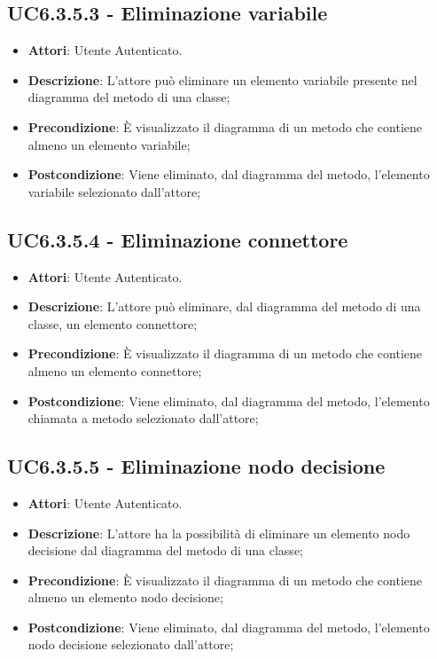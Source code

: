 \subsection{UC6.3.5.3 - Eliminazione variabile} 
\label{ssec:UC6.3.5.3} 
\begin{itemize} 
\item \textbf{Attori}: Utente Autenticato.
\item \textbf{Descrizione}: L'attore può eliminare un elemento variabile presente nel diagramma del metodo di una classe;
\item \textbf{Precondizione}: È visualizzato il diagramma di un metodo che contiene almeno un elemento variabile;
\item \textbf{Postcondizione}: Viene eliminato, dal diagramma del metodo,  l'elemento variabile selezionato dall'attore;
\end{itemize} 
\subsection{UC6.3.5.4 - Eliminazione connettore} 
\label{ssec:UC6.3.5.4} 
\begin{itemize} 
\item \textbf{Attori}: Utente Autenticato.
\item \textbf{Descrizione}: L'attore può eliminare, dal diagramma del metodo di una classe, un elemento connettore;
\item \textbf{Precondizione}: È visualizzato il diagramma di un metodo che contiene almeno un elemento connettore;
\item \textbf{Postcondizione}: Viene eliminato, dal diagramma del metodo,  l'elemento chiamata a metodo selezionato dall'attore;
\end{itemize} 
\subsection{UC6.3.5.5 - Eliminazione nodo decisione} 
\label{ssec:UC6.3.5.5} 
\begin{itemize} 
\item \textbf{Attori}: Utente Autenticato.
\item \textbf{Descrizione}: L'attore ha la possibilità di eliminare un elemento nodo decisione dal diagramma del metodo di una classe;
\item \textbf{Precondizione}: È visualizzato il diagramma di un metodo che contiene almeno un elemento nodo decisione;
\item \textbf{Postcondizione}: Viene eliminato, dal diagramma del metodo,  l'elemento nodo decisione selezionato dall'attore;
\end{itemize} 
